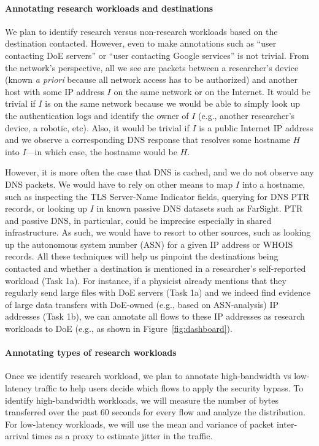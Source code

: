 \paragraph{Annotating research workloads and destinations}
We plan to identify research versus non-research workloads based on the destination contacted. However, even to make annotations such as ``user contacting DoE servers'' or ``user contacting Google services'' is not trivial.
From the network's perspective, all we see are packets between a researcher's device (known \textit{a priori} because all network access has to be authorized) and another host with some IP address $I$ on the same network or on the Internet. It would be trivial if $I$ is on the same network because we would be able to simply look up the authentication logs and identify the owner of $I$ (e.g., another researcher's device, a robotic, etc). Also, it would be trivial if $I$ is a public Internet IP address and we observe a corresponding DNS response that resolves some hostname $H$ into $I$---in which case, the hostname would be $H$.

However, it is more often the case that DNS is cached, and we do not observe any DNS packets. We would have to rely on other means to map $I$ into a hostname, such as inspecting the TLS Server-Name Indicator fields, querying for DNS PTR records, or looking up $I$ in known passive DNS datasets such as FarSight. PTR and passive DNS, in particular, could be imprecise especially in shared infrastructure. As such, we would have to resort to other sources, such as looking up the autonomous system number (ASN) for a given IP address or WHOIS records. All these techniques will help us pinpoint the destinations being contacted and whether a destination is mentioned in a researcher's self-reported workload (Task 1a). For instance, if a physicist already mentions that they regularly send large files with DoE servers (Task 1a) and we indeed find evidence of large data transfers with DoE-owned (e.g., based on ASN-analysis) IP addresses (Task 1b), we can annotate all flows to these IP addresses as research workloads to DoE (e.g., as shown in Figure~\ref{fig:dashboard}).



\paragraph{Annotating types of research workloads}
Once we identify research workload, we plan to annotate high-bandwidth vs low-latency traffic to help users decide which flows to apply the security bypass. To identify high-bandwidth workloads, we will measure the number of bytes transferred over the past 60 seconds for every flow and analyze the distribution. For low-latency workloads, we will use the mean and variance of packet inter-arrival times as a proxy to estimate jitter in the traffic.


